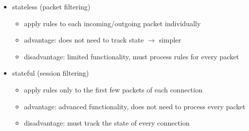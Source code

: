 \documentclass[final]{article}
\begin{document}
\begin{itemize}[nosep]
          \begin{multicols}{2}
              \begin{itemize}[nosep]
                  \item stateless (packet filtering)
                        \begin{itemize}
                            \item apply rules to each incoming/outgoing packet individually
                            \item advantage: does not need to track state $\rightarrow$ simpler
                            \item disadvantage: limited functionality, must process rules for every packet
                        \end{itemize}
                  \item stateful (session filtering)
                        \begin{itemize}[nosep]
                            \item apply rules only to the first few packets of each connection
                            \item advantage: advanced functionality, does not need to process every packet
                            \item disadvantage: must track the state of every connection
                        \end{itemize}
              \end{itemize}
          \end{multicols}
\end{itemize}
\end{document}
